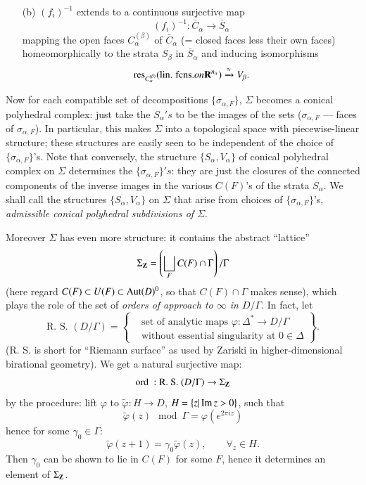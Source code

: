 \begin{defi*}
\begin{itemize}
\item[(b)] $(f_i)^{-1}$ extends to a continuous surjective map
$$
(f_i)^{-1} : \bar{C}_\alpha  \to \bar{S}_\alpha
$$
mapping the open faces $C^{(\beta)}_\alpha$ of $\bar{C}_\alpha$ (= closed faces less their own faces) homeomorphically to the strata $S_\beta$ in $\bar{S}_\alpha$ and inducing isomorphisms
$$
\operatorname{res}\limits_{C^{(\beta)}_\alpha} (\text{lin. fcns.} on \mathbf{R}^{n_\alpha}) \xrightarrow{\approx} V_\beta.
$$
\end{itemize}
\end{defi*}

Now for each compatible set of decompositions $\{\sigma_{\alpha, F}\}$, $\Sigma$  becomes a conical polyhedral complex: just take the $S_\alpha's$ to be the images of the sets ($\sigma_{\alpha, F}$ --- faces of $\sigma_{\alpha, F}$). In particular, this makes $\Sigma$ into a topological space with piecewise-linear structure; these structures are easily seen to be independent of the choice of $\{\sigma_{\alpha, F}\}$'s. Note that conversely, the structure $\{S_\alpha, V_\alpha\}$ of conical polyhedral complex on $\Sigma$ determines the $\{\sigma_{\alpha, F}\}'s$: they are just the closures of the connected components of the inverse images in the various $C(F)$'s of the strata $S_\alpha$. We shall call the structures $\{S_\alpha, V_\alpha\}$ on $\Sigma$ that arise from choices of $\{\sigma_{\alpha, F}\}$'s, \textit{admissible conical polyhedral subdivisions of $\Sigma$}.

Moreover $\Sigma$ has even more structure: it contains the abstract ``lattice''
$$
\Sigma_{\mathbf{Z}} = \left(\bigsqcup\limits_F C (F) \cap \Gamma \right) /\Gamma
$$
(here regard $C(F) \subset U (F) \subset \operatorname{Aut} (D)^0$, so that $C(F) \cap \Gamma$ makes sense), which plays the role of the set of \textit{orders of approach to $\infty$ in $D/ \Gamma$}. In fact, let
$$
\text{R. S. } (D/\Gamma) = 
\left\{
\begin{aligned}
& \text{set of analytic maps $\varphi : \Delta^\ast \to D/\Gamma$}\\
& \text{without essential singularity at } 0 \in\Delta
\end{aligned} 
\right\}.
$$
(R. S. is short for ``Riemann surface'' as used by Zariski in higher-dimensional birational geometry). We get a natural surjective map:
$$
\text{ord } : \text{R. S. } (D/\Gamma) \to \Sigma_{\mathbf{Z}}
$$\pageoriginale 
by the procedure: lift $\varphi$ to $\tilde{\varphi}: H \to D$, $H = \{z | \operatorname{Im} z > 0\}$, such that 
$$
\tilde{\varphi} (z) \mod \Gamma = \varphi (e^{2\pi i z})
$$
hence for some $\gamma_0 \in \Gamma$:
$$
\tilde{\varphi} (z+1) = \gamma_0 \tilde{\varphi}(z), \qquad \forall_z \in H.
$$
Then $\gamma_0$ can be shown to lie in $C(F)$ for some $F$, hence it determines an element of $\Sigma_{\mathbf{Z}}$.


